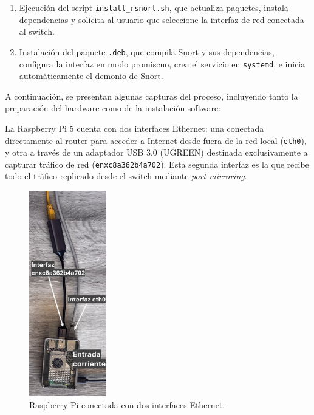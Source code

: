 \documentclass[11pt,a4paper,twoside]{report}
\begin{document}
\begin{enumerate}
	\item Ejecución del script \texttt{install\_rsnort.sh}, que actualiza paquetes, instala dependencias y solicita al usuario que seleccione la interfaz de red conectada al switch.
	\item Instalación del paquete \texttt{.deb}, que compila Snort y sus dependencias, configura la interfaz en modo promiscuo, crea el servicio en \texttt{systemd}, e inicia automáticamente el demonio de Snort.
\end{enumerate}

A continuación, se presentan algunas capturas del proceso, incluyendo tanto la preparación del hardware como de la instalación software:\newline

La Raspberry Pi 5 cuenta con dos interfaces Ethernet: una conectada directamente al router para acceder a Internet desde fuera de la red local (\texttt{eth0}), y otra a través de un adaptador USB 3.0 (UGREEN) destinada exclusivamente a capturar tráfico de red (\texttt{enxc8a362b4a702}). Esta segunda interfaz es la que recibe todo el tráfico replicado desde el switch mediante \textit{port mirroring}.

\begin{figure}[H]
	\centering
	\includegraphics[width=0.3\textwidth]{pruebas_config/1-1.JPG}
	\caption{Raspberry Pi conectada con dos interfaces Ethernet.}
\end{figure}

\pagebreak
\end{document}
